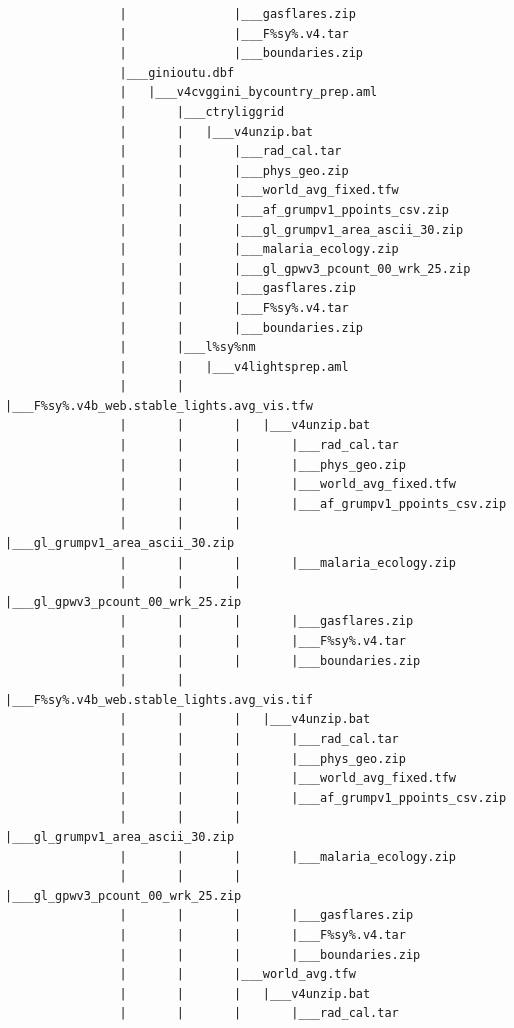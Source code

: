 \documentclass[]{book}
\begin{document}
\begin{verbatim}
                |               |___gasflares.zip
                |               |___F%sy%.v4.tar
                |               |___boundaries.zip
                |___ginioutu.dbf
                |   |___v4cvggini_bycountry_prep.aml
                |       |___ctryliggrid
                |       |   |___v4unzip.bat
                |       |       |___rad_cal.tar
                |       |       |___phys_geo.zip
                |       |       |___world_avg_fixed.tfw
                |       |       |___af_grumpv1_ppoints_csv.zip
                |       |       |___gl_grumpv1_area_ascii_30.zip
                |       |       |___malaria_ecology.zip
                |       |       |___gl_gpwv3_pcount_00_wrk_25.zip
                |       |       |___gasflares.zip
                |       |       |___F%sy%.v4.tar
                |       |       |___boundaries.zip
                |       |___l%sy%nm
                |       |   |___v4lightsprep.aml
                |       |       |___F%sy%.v4b_web.stable_lights.avg_vis.tfw
                |       |       |   |___v4unzip.bat
                |       |       |       |___rad_cal.tar
                |       |       |       |___phys_geo.zip
                |       |       |       |___world_avg_fixed.tfw
                |       |       |       |___af_grumpv1_ppoints_csv.zip
                |       |       |       |___gl_grumpv1_area_ascii_30.zip
                |       |       |       |___malaria_ecology.zip
                |       |       |       |___gl_gpwv3_pcount_00_wrk_25.zip
                |       |       |       |___gasflares.zip
                |       |       |       |___F%sy%.v4.tar
                |       |       |       |___boundaries.zip
                |       |       |___F%sy%.v4b_web.stable_lights.avg_vis.tif
                |       |       |   |___v4unzip.bat
                |       |       |       |___rad_cal.tar
                |       |       |       |___phys_geo.zip
                |       |       |       |___world_avg_fixed.tfw
                |       |       |       |___af_grumpv1_ppoints_csv.zip
                |       |       |       |___gl_grumpv1_area_ascii_30.zip
                |       |       |       |___malaria_ecology.zip
                |       |       |       |___gl_gpwv3_pcount_00_wrk_25.zip
                |       |       |       |___gasflares.zip
                |       |       |       |___F%sy%.v4.tar
                |       |       |       |___boundaries.zip
                |       |       |___world_avg.tfw
                |       |       |   |___v4unzip.bat
                |       |       |       |___rad_cal.tar

\end{verbatim}
\end{document}

